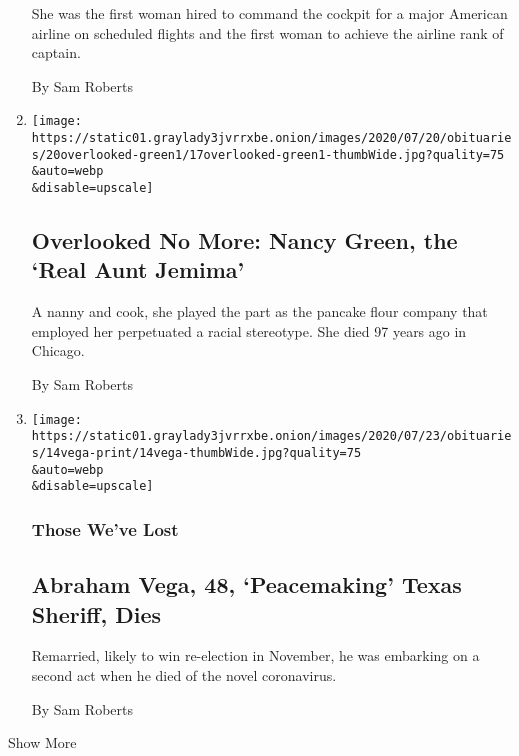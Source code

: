 \begin{enumerate}
  She was the first woman hired to command the cockpit for a major
  American airline on scheduled flights and the first woman to achieve
  the airline rank of captain.

  By Sam Roberts
\item
  \href{/2020/07/17/obituaries/nancy-green-aunt-jemima-overlooked.html}{}

  \texttt{[image: https://static01.graylady3jvrrxbe.onion/images/2020/07/20/obituaries/20overlooked-green1/17overlooked-green1-thumbWide.jpg?quality=75\\\&auto=webp\\\&disable=upscale]}

  \hypertarget{overlooked-no-more-nancy-green-the-real-aunt-jemima}{%
  \subsection{Overlooked No More: Nancy Green, the `Real Aunt
  Jemima'}\label{overlooked-no-more-nancy-green-the-real-aunt-jemima}}

  A nanny and cook, she played the part as the pancake flour company
  that employed her perpetuated a racial stereotype. She died 97 years
  ago in Chicago.

  By Sam Roberts
\item
  \href{/2020/07/14/us/abraham-vega-dead-coronavirus.html}{}

  \texttt{[image: https://static01.graylady3jvrrxbe.onion/images/2020/07/23/obituaries/14vega-print/14vega-thumbWide.jpg?quality=75\\\&auto=webp\\\&disable=upscale]}

  \hypertarget{those-weve-lost-2}{%
  \subsubsection{Those We've Lost}\label{those-weve-lost-2}}

  \hypertarget{abraham-vega-48-peacemaking-texas-sheriff-dies}{%
  \subsection{Abraham Vega, 48, `Peacemaking' Texas Sheriff,
  Dies}\label{abraham-vega-48-peacemaking-texas-sheriff-dies}}

  Remarried, likely to win re-election in November, he was embarking on
  a second act when he died of the novel coronavirus.

  By Sam Roberts
\end{enumerate}

Show More

